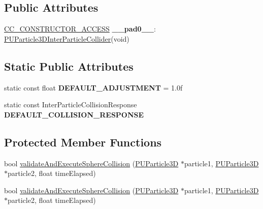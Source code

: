 \subsection*{Public Attributes}
\begin{DoxyCompactItemize}
\item 
\mbox{\label{classPUParticle3DInterParticleCollider_ae42ab9a3ec64c727f2bde539dca3eb75}} 
\hyperlink{_2cocos2d_2cocos_2base_2ccConfig_8h_a25ef1314f97c35a2ed3d029b0ead6da0}{C\+C\+\_\+\+C\+O\+N\+S\+T\+R\+U\+C\+T\+O\+R\+\_\+\+A\+C\+C\+E\+SS} {\bfseries \+\_\+\+\_\+pad0\+\_\+\+\_\+}\+: \hyperlink{classPUParticle3DInterParticleCollider}{P\+U\+Particle3\+D\+Inter\+Particle\+Collider}(void)
\end{DoxyCompactItemize}
\subsection*{Static Public Attributes}
\begin{DoxyCompactItemize}
\item 
\mbox{\label{classPUParticle3DInterParticleCollider_ad0abc5859fdc51654ab90be5cf9fcefa}} 
static const float {\bfseries D\+E\+F\+A\+U\+L\+T\+\_\+\+A\+D\+J\+U\+S\+T\+M\+E\+NT} = 1.\+0f
\item 
static const Inter\+Particle\+Collision\+Response {\bfseries D\+E\+F\+A\+U\+L\+T\+\_\+\+C\+O\+L\+L\+I\+S\+I\+O\+N\+\_\+\+R\+E\+S\+P\+O\+N\+SE}
\end{DoxyCompactItemize}
\subsection*{Protected Member Functions}
\begin{DoxyCompactItemize}
\item 
bool \hyperlink{classPUParticle3DInterParticleCollider_aca01144b3d2a99c3148932bc8ec9bf05}{validate\+And\+Execute\+Sphere\+Collision} (\hyperlink{structPUParticle3D}{P\+U\+Particle3D} $\ast$particle1, \hyperlink{structPUParticle3D}{P\+U\+Particle3D} $\ast$particle2, float time\+Elapsed)
\item 
bool \hyperlink{classPUParticle3DInterParticleCollider_aca01144b3d2a99c3148932bc8ec9bf05}{validate\+And\+Execute\+Sphere\+Collision} (\hyperlink{structPUParticle3D}{P\+U\+Particle3D} $\ast$particle1, \hyperlink{structPUParticle3D}{P\+U\+Particle3D} $\ast$particle2, float time\+Elapsed)
\end{DoxyCompactItemize}
